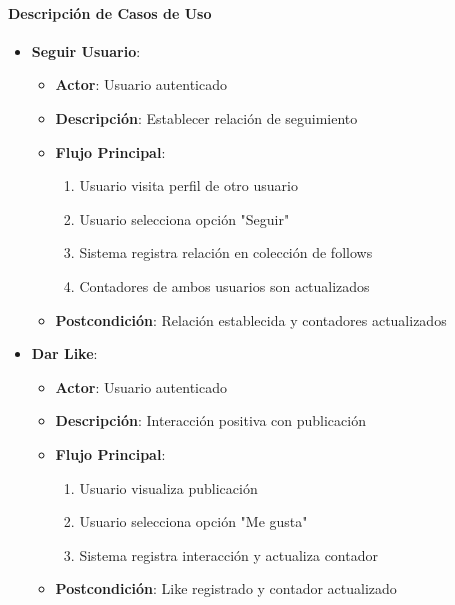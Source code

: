 \documentclass[12pt,letterpaper]{article}
\begin{document}
\paragraph{Descripción de Casos de Uso}
\begin{itemize}
    \item \textbf{Seguir Usuario}:
    \begin{itemize}
        \item \textbf{Actor}: Usuario autenticado
        \item \textbf{Descripción}: Establecer relación de seguimiento
        \item \textbf{Flujo Principal}:
        \begin{enumerate}
            \item Usuario visita perfil de otro usuario
            \item Usuario selecciona opción "Seguir"
            \item Sistema registra relación en colección de follows
            \item Contadores de ambos usuarios son actualizados
        \end{enumerate}
        \item \textbf{Postcondición}: Relación establecida y contadores actualizados
    \end{itemize}
    
    \item \textbf{Dar Like}:
    \begin{itemize}
        \item \textbf{Actor}: Usuario autenticado
        \item \textbf{Descripción}: Interacción positiva con publicación
        \item \textbf{Flujo Principal}:
        \begin{enumerate}
            \item Usuario visualiza publicación
            \item Usuario selecciona opción "Me gusta"
            \item Sistema registra interacción y actualiza contador
        \end{enumerate}
        \item \textbf{Postcondición}: Like registrado y contador actualizado
    \end{itemize}
    

\end{itemize}
\end{document}
